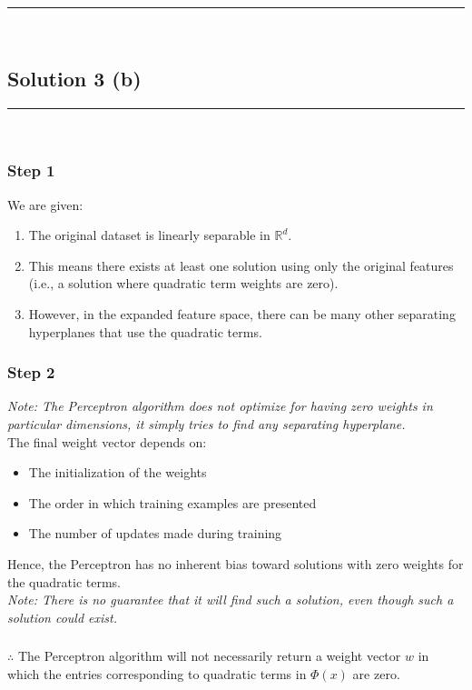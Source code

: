 \documentclass{article}
\begin{document}
\noindent\rule{\textwidth}{0.4pt}\\

\newpage

\subsection*{Solution 3 (b)}
\noindent\rule{\textwidth}{0.4pt}\\

\subsubsection*{Step 1}
\parbox{\textwidth}{
We are given:
\begin{enumerate}
\item The original dataset is linearly separable in $\mathbb{R}^d$.
\item This means there exists at least one solution using only the original features (i.e., a solution where quadratic term weights are zero).
\item However, in the expanded feature space, there can be many other separating hyperplanes that use the quadratic terms.
\end{enumerate}
}
\subsubsection*{Step 2}
\parbox{\textwidth}{
\textit{Note: The Perceptron algorithm does not optimize for having zero weights in particular dimensions, it simply tries to find any separating hyperplane.}\\

The final weight vector depends on:
\begin{itemize}
\item The initialization of the weights
\item The order in which training examples are presented
\item The number of updates made during training
\end{itemize}
Hence, the Perceptron has no inherent bias toward solutions with zero weights for the quadratic terms.\\

\textit{Note: There is no guarantee that it will find such a solution, even though such a solution could exist.}
}

\subsubsection*{\normalfont}{$\therefore$ The Perceptron algorithm will not necessarily return a weight vector $w$ in which the entries corresponding to quadratic terms in $\Phi(x)$ are zero.}
\end{document}
